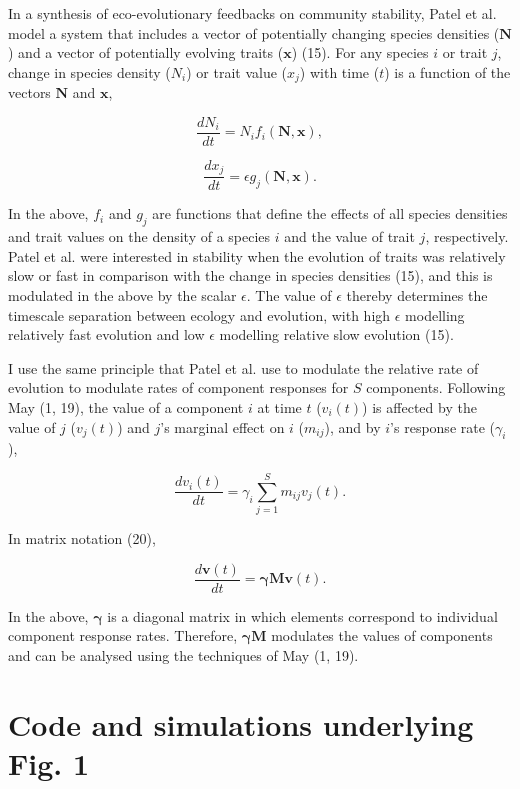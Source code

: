 \documentclass[]{article}
\begin{document}
In a synthesis of eco-evolutionary feedbacks on community stability,
Patel et al. model a system that includes a vector of potentially
changing species densities (\(\mathbf{N}\)) and a vector of potentially
evolving traits (\(\mathbf{x}\)) (15). For any species \(i\) or trait
\(j\), change in species density (\(N_{i}\)) or trait value (\(x_{j}\))
with time (\(t\)) is a function of the vectors \(\mathbf{N}\) and
\(\mathbf{x}\),

\[\frac{dN_{i}}{dt} = N_{i}f_{i}(\mathbf{N}, \mathbf{x}),\]

\[\frac{dx_{j}}{dt} = \epsilon g_{j}(\mathbf{N}, \mathbf{x}).\]

In the above, \(f_{i}\) and \(g_{j}\) are functions that define the
effects of all species densities and trait values on the density of a
species \(i\) and the value of trait \(j\), respectively. Patel et al.
were interested in stability when the evolution of traits was relatively
slow or fast in comparison with the change in species densities (15),
and this is modulated in the above by the scalar \(\epsilon\). The value
of \(\epsilon\) thereby determines the timescale separation between
ecology and evolution, with high \(\epsilon\) modelling relatively fast
evolution and low \(\epsilon\) modelling relative slow evolution (15).

I use the same principle that Patel et al. use to modulate the relative
rate of evolution to modulate rates of component responses for \(S\)
components. Following May (1, 19), the value of a component \(i\) at
time \(t\) (\(v_{i}(t)\)) is affected by the value of \(j\)
(\(v_{j}(t)\)) and \(j\)'s marginal effect on \(i\) (\(m_{ij}\)), and by
\(i\)'s response rate (\(\gamma_{i}\)),

\[\frac{dv_{i}(t)}{dt} = \gamma_{i} \sum_{j=1}^{S}m_{ij}v_{j}(t).\]

In matrix notation (20),

\[\frac{d\mathbf{v}(t)}{dt} = \mathbf{\gamma} \mathbf{M}\mathbf{v}(t).\]

In the above, \(\mathbf{\gamma}\) is a diagonal matrix in which elements
correspond to individual component response rates. Therefore,
\(\mathbf{\gamma} \mathbf{M}\) modulates the values of components and
can be analysed using the techniques of May (1, 19).

\hypertarget{Fig1}{\section{Code and simulations underlying Fig.
1}\label{Fig1}}
\end{document}
